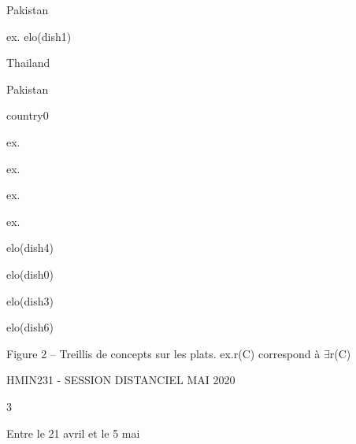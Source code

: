 \documentclass[a4paper,portrait,12pt]{article}
\begin{document}
\begin{flushleft}
Pakistan
\end{flushleft}


\begin{flushleft}
ex. elo(dish1)
\end{flushleft}





\begin{flushleft}
Thailand
\end{flushleft}





\begin{flushleft}
Pakistan
\end{flushleft}





\begin{flushleft}
country0
\end{flushleft}


\begin{flushleft}
ex.
\end{flushleft}


\begin{flushleft}
ex.
\end{flushleft}


\begin{flushleft}
ex.
\end{flushleft}


\begin{flushleft}
ex.
\end{flushleft}





\begin{flushleft}
elo(dish4)
\end{flushleft}


\begin{flushleft}
elo(dish0)
\end{flushleft}


\begin{flushleft}
elo(dish3)
\end{flushleft}


\begin{flushleft}
elo(dish6)
\end{flushleft}





\begin{flushleft}
Figure 2 -- Treillis de concepts sur les plats. ex.r(C) correspond à $\exists$r(C)
\end{flushleft}





\begin{flushleft}
HMIN231 - SESSION DISTANCIEL MAI 2020
\end{flushleft}





3





\begin{flushleft}
Entre le 21 avril et le 5 mai
\end{flushleft}





\newpage
\end{document}
